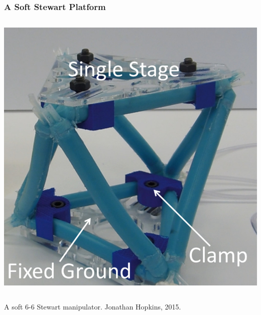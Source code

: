 \begin{frame}
	\frametitle{A Soft Stewart Platform}
	\begin{columns}[b]
		\begin{column}{.8\columnwidth}		
			\begin{tcolorbox}[colframe=blue!80!green, coltitle=white!80,toggle enlargement=none]
				\centering 
				\includegraphics[width=.8\textwidth]{../Notes/figures/soft_parallel.jpg} 
			\end{tcolorbox} 
		\end{column}	
	\end{columns}
	\centering \footnotesize{A soft 6-6 Stewart manipulator. Jonathan Hopkins, 2015.}
\end{frame}


